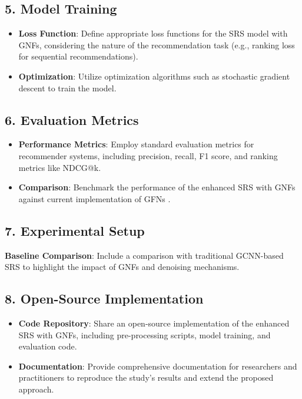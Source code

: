 \documentclass[journal]{IEEEtran}
\begin{document}
\subsection*{5. Model Training}

\begin{itemize}
  \item \textbf{Loss Function}: Define appropriate loss functions for the SRS model with GNFs, considering the nature of the recommendation task (e.g., ranking loss for sequential recommendations).
  \item \textbf{Optimization}: Utilize optimization algorithms such as stochastic gradient descent to train the model.
\end{itemize}

\subsection*{6. Evaluation Metrics}

\begin{itemize}
  \item \textbf{Performance Metrics}: Employ standard evaluation metrics for recommender systems, including precision, recall, F1 score, and ranking metrics like NDCG@k.
  \item \textbf{Comparison}: Benchmark the performance of the enhanced SRS with GNFs against current implementation of GFNs \cite{tenorio2021robust}.
\end{itemize}

\subsection*{7. Experimental Setup}

\textbf{Baseline Comparison}: Include a comparison with traditional GCNN-based SRS to highlight the impact of GNFs and denoising mechanisms.

\subsection*{8. Open-Source Implementation}

\begin{itemize}
  \item \textbf{Code Repository}: Share an open-source implementation of the enhanced SRS with GNFs, including pre-processing scripts, model training, and evaluation code.
  \item \textbf{Documentation}: Provide comprehensive documentation for researchers and practitioners to reproduce the study's results and extend the proposed approach.
\end{itemize}
\end{document}

